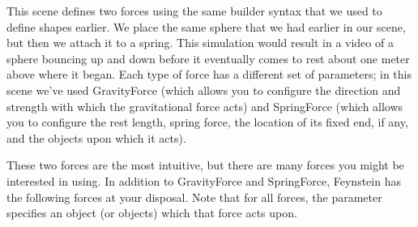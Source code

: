 This scene defines two forces using the same builder syntax that we
used to define shapes earlier. We place the same sphere that we had
earlier in our scene, but then we attach it to a spring. This
simulation would result in a video of a sphere bouncing up and down
before it eventually comes to rest about one meter above where it
began. Each type of force has a different set of parameters; in this
scene we've used GravityForce (which allows you to configure the
direction and strength with which the gravitational force acts) and
SpringForce (which allows you to configure the rest length, spring
force, the location of its fixed end, if any, and the objects upon
which it acts).

These two forces are the most intuitive, but there are many forces you
might be interested in using. In addition to GravityForce and
SpringForce, Feynstein has the following forces at your disposal. Note
that for all forces, the parameter  specifies an object (or
objects) which that force acts upon.


